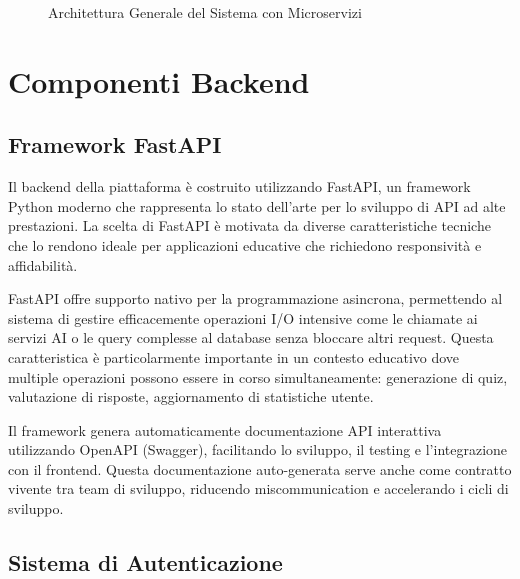 \documentclass[12pt,a4paper]{article}
\begin{document}
\begin{figure}[H]
\caption{Architettura Generale del Sistema con Microservizi}
\label{fig:architecture}
\end{figure}

\section{Componenti Backend}

\subsection{Framework FastAPI}

Il backend della piattaforma è costruito utilizzando FastAPI, un framework Python moderno che rappresenta lo stato dell'arte per lo sviluppo di API ad alte prestazioni. La scelta di FastAPI è motivata da diverse caratteristiche tecniche che lo rendono ideale per applicazioni educative che richiedono responsività e affidabilità.

FastAPI offre supporto nativo per la programmazione asincrona, permettendo al sistema di gestire efficacemente operazioni I/O intensive come le chiamate ai servizi AI o le query complesse al database senza bloccare altri request. Questa caratteristica è particolarmente importante in un contesto educativo dove multiple operazioni possono essere in corso simultaneamente: generazione di quiz, valutazione di risposte, aggiornamento di statistiche utente.

Il framework genera automaticamente documentazione API interattiva utilizzando OpenAPI (Swagger), facilitando lo sviluppo, il testing e l'integrazione con il frontend. Questa documentazione auto-generata serve anche come contratto vivente tra team di sviluppo, riducendo miscommunication e accelerando i cicli di sviluppo.

\subsection{Sistema di Autenticazione}
\end{document}
